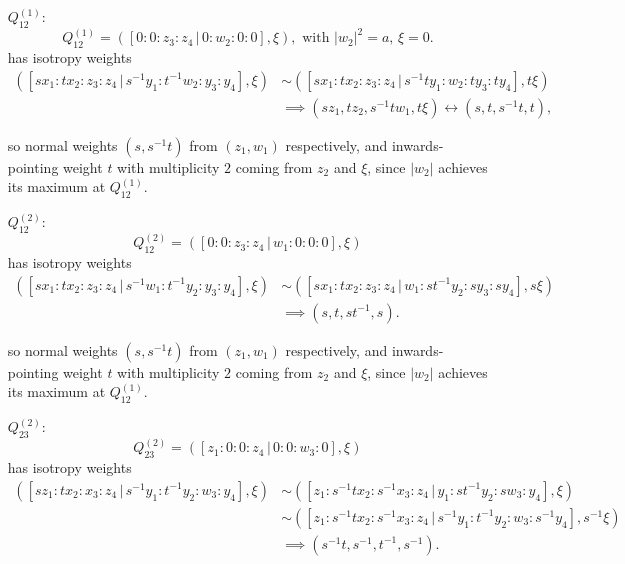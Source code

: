 \documentclass{article}
\begin{document}
	\begin{itemize}
		\item[$Q_{12}^{(1)}$:]
		\[
			Q_{12}^{(1)} = \left( [ 0 : 0 : z_{3} : z_{4} \, | \, 0 : w_{2} : 0 : 0 ], \xi \right), \text{ with } |w_{2}|^{2} = a,\, \xi = 0.
		\]
		has isotropy weights
		\begin{align*}
			\left( [sx_{1} : tx_{2} : z_{3} : z_{4} \, | \, s^{-1}y_{1} : t^{-1}w_{2} : y_{3} : y_{4}], \xi \right) &\sim \left( [sx_{1} : tx_{2} : z_{3} : z_{4} \, | \, s^{-1}ty_{1} : w_{2} : ty_{3} : ty_{4}], t\xi \right) \\ &\implies (sz_{1}, tz_{2}, s^{-1}tw_{1}, t\xi) \leftrightarrow (s, t, s^{-1}t, t),
		\end{align*}
	
		so normal weights $(s, s^{-1}t)$ from $(z_{1}, w_{1})$ respectively, and inwards-pointing weight $t$ with multiplicity $2$ coming from $z_{2}$ and $\xi$, since $|w_{2}|$ achieves its maximum at $Q_{12}^{(1)}$.
	
		\item[$Q_{12}^{(2)}$:]
		\[
			Q_{12}^{(2)} = \left( [ 0 : 0 : z_{3} : z_{4} \, | \, w_{1} : 0 : 0 : 0 ], \xi \right)
		\]
		has isotropy weights
		\begin{align*}
			\left( [sx_{1} : tx_{2} : z_{3} : z_{4} \, | \, s^{-1}w_{1} : t^{-1}y_{2} : y_{3} : y_{4}], \xi \right) &\sim \left( [sx_{1} : tx_{2} : z_{3} : z_{4} \, | \, w_{1} : st^{-1}y_{2} : sy_{3} : sy_{4}], s\xi \right) \\ &\implies (s, t, st^{-1}, s).
		\end{align*}
	
		so normal weights $(s, s^{-1}t)$ from $(z_{1}, w_{1})$ respectively, and inwards-pointing weight $t$ with multiplicity $2$ coming from $z_{2}$ and $\xi$, since $|w_{2}|$ achieves its maximum at $Q_{12}^{(1)}$.
	
		\item[$Q_{23}^{(2)}$:]
		\[
		Q_{23}^{(2)} = \left( [ z_{1} : 0 : 0 : z_{4} \, | \, 0 : 0 : w_{3} : 0 ], \xi \right)
		\]
		has isotropy weights
		\begin{align*}
			\left( [sz_{1} : tx_{2} : x_{3} : z_{4} \, | \, s^{-1}y_{1} : t^{-1}y_{2} : w_{3} : y_{4}], \xi \right) &\sim \left( [z_{1} : s^{-1}tx_{2} : s^{-1}x_{3} : z_{4} \, | \, y_{1} : st^{-1}y_{2} : sw_{3} : y_{4} ], \xi \right) \\ &\sim \left( [z_{1} : s^{-1}tx_{2} : s^{-1}x_{3} : z_{4} \, | \, s^{-1}y_{1} : t^{-1}y_{2} : w_{3} : s^{-1}y_{4} ], s^{-1}\xi \right) \\ &\implies (s^{-1}t, s^{-1}, t^{-1}, s^{-1}).
		\end{align*}
	

\end{itemize}
\end{document}
